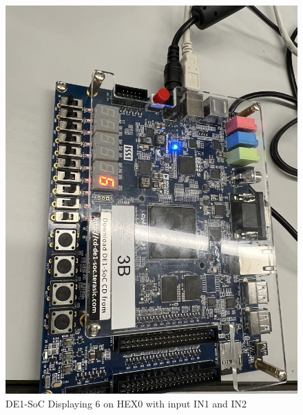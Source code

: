 \documentclass[
	letterpaper, %
	10pt, %
]{CSUniSchoolLabReport}
\begin{document}
\begin{figure}[H]
  \centering
  \includegraphics[width=.9\textwidth]{Figures/Disp_6.jpg}
  \caption{DE1-SoC Displaying 6 on HEX0 with input IN1 and IN2}
  \label{fig:9}
\end{figure}
\end{document}
